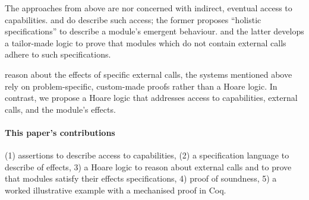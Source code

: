  The approaches from above %
 are nor concerned with indirect, eventual access to capabilities.
\citet{FASE} and \citet{OOPSLA22} do describe such access; %
  the former proposes  ``holistic specifications'' to describe a module's emergent behaviour. 
and the latter develops 
a tailor-made logic to prove that modules which do not contain external calls adhere to such specifications.

\vspace{.03cm}

 reason about the effects of specific external calls, the systems mentioned above  rely on problem-specific, custom-made proofs rather than a Hoare logic.
 In contrast, we propose a Hoare logic that addresses access to capabilities, external calls, and the module's \tamed effects.

  
\paragraph{This paper's contributions} %
{(1) assertions to describe   access to capabilities}, 
(2) a specification language to describe \taming of effects,
3) a Hoare logic to reason about external calls and to prove that modules satisfy their \tamed effects specifications,
4)  proof of soundness,
5) a worked illustrative example {with a mechanised proof in Coq}.
 

